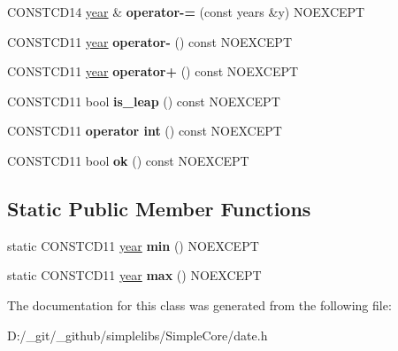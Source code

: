 \begin{DoxyCompactItemize}
C\+O\+N\+S\+T\+C\+D14 \mbox{\hyperlink{classdate_1_1year}{year}} \& {\bfseries operator-\/=} (const years \&y) N\+O\+E\+X\+C\+E\+PT
\item 
\mbox{\label{classdate_1_1year_a52ea8451abcc9d433f046b06607b8dfc}} 
C\+O\+N\+S\+T\+C\+D11 \mbox{\hyperlink{classdate_1_1year}{year}} {\bfseries operator-\/} () const N\+O\+E\+X\+C\+E\+PT
\item 
\mbox{\label{classdate_1_1year_a2ac832d148b5d02aab5ac4b3a80da404}} 
C\+O\+N\+S\+T\+C\+D11 \mbox{\hyperlink{classdate_1_1year}{year}} {\bfseries operator+} () const N\+O\+E\+X\+C\+E\+PT
\item 
\mbox{\label{classdate_1_1year_a40e9e2f0c5dfab3290329fd89a7a9266}} 
C\+O\+N\+S\+T\+C\+D11 bool {\bfseries is\+\_\+leap} () const N\+O\+E\+X\+C\+E\+PT
\item 
\mbox{\label{classdate_1_1year_a56a148aa2db6ccabb7691e712881172d}} 
C\+O\+N\+S\+T\+C\+D11 {\bfseries operator int} () const N\+O\+E\+X\+C\+E\+PT
\item 
\mbox{\label{classdate_1_1year_a4760a74f84a239c906236d957e312432}} 
C\+O\+N\+S\+T\+C\+D11 bool {\bfseries ok} () const N\+O\+E\+X\+C\+E\+PT
\end{DoxyCompactItemize}
\subsection*{Static Public Member Functions}
\begin{DoxyCompactItemize}
\item 
\mbox{\label{classdate_1_1year_ab2ee02d911fe5da7e9314d99689c1bb0}} 
static C\+O\+N\+S\+T\+C\+D11 \mbox{\hyperlink{classdate_1_1year}{year}} {\bfseries min} () N\+O\+E\+X\+C\+E\+PT
\item 
\mbox{\label{classdate_1_1year_af6d73feb38dab4cd867cb91a6da91f13}} 
static C\+O\+N\+S\+T\+C\+D11 \mbox{\hyperlink{classdate_1_1year}{year}} {\bfseries max} () N\+O\+E\+X\+C\+E\+PT
\end{DoxyCompactItemize}


The documentation for this class was generated from the following file\+:\begin{DoxyCompactItemize}
\item 
D\+:/\+\_\+git/\+\_\+github/simplelibs/\+Simple\+Core/date.\+h\end{DoxyCompactItemize}
